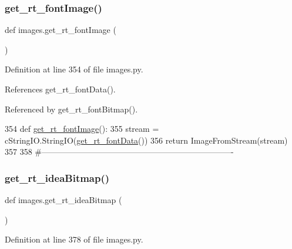 \mbox{\label{namespaceimages_a934c1076ea7244d3996bb80131c3ad3c}} 
\subsubsection{\texorpdfstring{get\+\_\+rt\+\_\+font\+Image()}{get\_rt\_fontImage()}}
{\footnotesize\ttfamily def images.\+get\+\_\+rt\+\_\+font\+Image (\begin{DoxyParamCaption}{ }\end{DoxyParamCaption})}



Definition at line 354 of file images.\+py.



References get\+\_\+rt\+\_\+font\+Data().



Referenced by get\+\_\+rt\+\_\+font\+Bitmap().


\begin{DoxyCode}
354 \textcolor{keyword}{def }\hyperlink{namespaceimages_a934c1076ea7244d3996bb80131c3ad3c}{get\_rt\_fontImage}():
355     stream = cStringIO.StringIO(\hyperlink{namespaceimages_a1b911d4fa04b4af968ec1adc8d82e9f1}{get\_rt\_fontData}())
356     \textcolor{keywordflow}{return} ImageFromStream(stream)
357 
358 \textcolor{comment}{#----------------------------------------------------------------------}
\end{DoxyCode}
\mbox{\label{namespaceimages_a3da1175f8c1f38ab38d6f68b3355bd50}} 
\subsubsection{\texorpdfstring{get\+\_\+rt\+\_\+idea\+Bitmap()}{get\_rt\_ideaBitmap()}}
{\footnotesize\ttfamily def images.\+get\+\_\+rt\+\_\+idea\+Bitmap (\begin{DoxyParamCaption}{ }\end{DoxyParamCaption})}



Definition at line 378 of file images.\+py.



